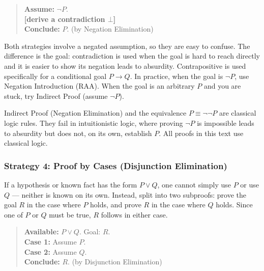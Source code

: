 \begin{quote}
\textbf{Assume:} $\neg P$. \\
\textbf{[derive a contradiction $\bot$]} \\
\textbf{Conclude:} $P$. \quad (by Negation Elimination)
\end{quote}

\begin{remark}
Both strategies involve a negated assumption, so they are easy to confuse.
The difference is the goal: contradiction is used when the goal is hard to
reach directly and it is easier to show its negation leads to absurdity.
Contrapositive is used specifically for a conditional goal $P \to Q$.
In practice, when the goal is $\neg P$, use Negation Introduction (RAA). When
the goal is an arbitrary $P$ and you are stuck, try Indirect Proof (assume
$\neg P$).
\end{remark}

\begin{remark}
Indirect Proof (Negation Elimination) and the equivalence $P \equiv \neg\neg P$
are classical logic rules. They fail in intuitionistic logic, where proving $\neg P$
is impossible leads to absurdity but does not, on its own, establish $P$.
All proofs in this text use classical logic.
\end{remark}


\subsubsection*{Strategy 4: Proof by Cases (Disjunction Elimination)}

If a hypothesis or known fact has the form $P \vee Q$, one cannot simply use
$P$ or use $Q$ --- neither is known on its own. Instead, split into two
subproofs: prove the goal $R$ in the case where $P$ holds, and prove $R$ in
the case where $Q$ holds. Since one of $P$ or $Q$ must be true, $R$ follows
in either case.

\begin{quote}
\textbf{Available:} $P \vee Q$. Goal: $R$. \\
\textbf{Case 1:} Assume $P$. \quad [derive $R$] \\
\textbf{Case 2:} Assume $Q$. \quad [derive $R$] \\
\textbf{Conclude:} $R$. \quad (by Disjunction Elimination)
\end{quote}


